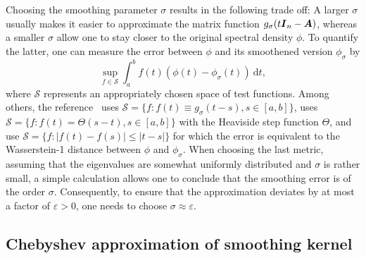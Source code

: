 Choosing the smoothing parameter $\sigma$ results in the following trade off: A larger $\sigma$ usually makes it  easier to approximate the matrix function $g_{\sigma}(t\boldsymbol{I}_n - \boldsymbol{A})$, whereas a smaller $\sigma$ allow one to stay closer to the original spectral density $\phi$. To quantify the latter, one can measure the error between $\phi$ and its smoothened version $\phi_{\sigma}$ by
\begin{equation}
    \sup_{f \in \mathcal{S}} \int_{a}^{b} f(t) (\phi(t) - \phi_{\sigma}(t))~\mathrm{d}t,
    \label{equ:error-metric}
\end{equation}
where $\mathcal{S}$ represents an appropriately chosen space of test functions. Among others, the reference~\cite{lin-2016-approximating-spectral} uses $\mathcal{S} = \{ f: f(t) \equiv g_{\sigma}(t - s), s \in [a, b]\}$, \cite{chen-2021-analysis-stochastic} uses $\mathcal{S} = \{f : f(t) = \Theta(s - t), s \in [a, b] \}$ with the Heaviside step function $\Theta$, and \cite{braverman-2022-sublinear-time,bhattacharjee-2024-improved-spectral} use $\mathcal{S} = \{f : |f(t) - f(s)| \leq |t - s| \}$ for which the error  is equivalent to the Wasserstein-1 distance between $\phi$ and $\phi_{\sigma}$.
When choosing 
the last metric,
assuming that the eigenvalues are somewhat uniformly distributed and $\sigma$ is rather small, a simple calculation allows one to conclude that the smoothing error  is of the order $\sigma$. Consequently, to ensure that the approximation deviates by at most a factor of $\varepsilon > 0$, one needs to choose $\sigma \approx \varepsilon$.

\subsection{Chebyshev approximation of smoothing kernel}
\label{subsec:chebyshev-approximation}

